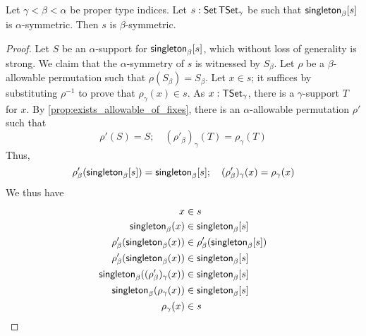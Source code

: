 \begin{proposition}
  \label{prop:singleton_union}
  Let \( \gamma < \beta < \alpha \) be proper type indices.
  Let \( s : \operatorname{\mathsf{Set}} \mathsf{TSet}_\gamma \) be such that \( \operatorname{\mathsf{singleton}}_\beta[s] \) is \( \alpha \)-symmetric.
  Then \( s \) is \( \beta \)-symmetric.
\end{proposition}
\begin{proof}
  Let \( S \) be an \( \alpha \)-support for \( \operatorname{\mathsf{singleton}}_\beta[s] \), which without loss of generality is strong.
  We claim that the \( \alpha \)-symmetry of \( s \) is witnessed by \( S_\beta \).
  Let \( \rho \) be a \( \beta \)-allowable permutation such that \( \rho(S_\beta) = S_\beta \).
  Let \( x \in s \); it suffices by substituting \( \rho^{-1} \) to prove that \( \rho_\gamma(x) \in s \).
  As \( x : \mathsf{TSet}_\gamma \), there is a \( \gamma \)-support \( T \) for \( x \).
  By \cref{prop:exists_allowable_of_fixes}, there is an \( \alpha \)-allowable permutation \( \rho' \) such that
  \[ \rho'(S) = S;\quad (\rho'_\beta)_\gamma(T) = \rho_\gamma(T) \]
  Thus,
  \[ \rho'_\beta(\operatorname{\mathsf{singleton}}_\beta[s]) = \operatorname{\mathsf{singleton}}_\beta[s];\quad (\rho'_\beta)_\gamma(x) = \rho_\gamma(x) \]
  We thus have
  \begin{align*}
    x &\in s \\
    \operatorname{\mathsf{singleton}}_\beta(x) &\in \operatorname{\mathsf{singleton}}_\beta[s] \\
    \rho'_\beta(\operatorname{\mathsf{singleton}}_\beta(x)) &\in \rho'_\beta(\operatorname{\mathsf{singleton}}_\beta[s]) \\
    \rho'_\beta(\operatorname{\mathsf{singleton}}_\beta(x)) &\in \operatorname{\mathsf{singleton}}_\beta[s] \\
    \operatorname{\mathsf{singleton}}_\beta((\rho'_\beta)_\gamma(x)) &\in \operatorname{\mathsf{singleton}}_\beta[s] \\
    \operatorname{\mathsf{singleton}}_\beta(\rho_\gamma(x)) &\in \operatorname{\mathsf{singleton}}_\beta[s] \\
    \rho_\gamma(x) &\in s \\
  \end{align*}
\end{proof}
